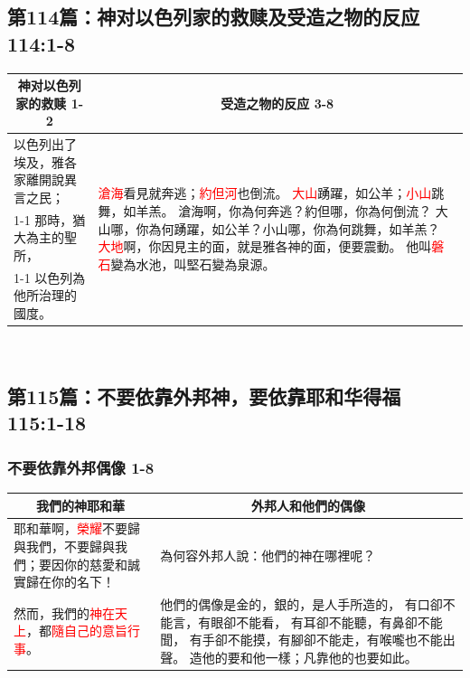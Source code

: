 \subsection{第114篇：神对以色列家的救赎及受造之物的反应 114:1-8}
\begin{table}[H]
\centering
\begin{tabular}{p{5cm}|p{12.00cm}}\hline\hline
\multicolumn{1}{c|}{神对以色列家的救赎 1-2}&\multicolumn{1}{c}{受造之物的反应 3-8}\\\hline
以色列出了埃及，雅各家離開說異言之民；
&\multirow{3}{12.2cm}{\textcolor{red}{滄海}看見就奔逃；\textcolor{red}{約但河}也倒流。
\textcolor{red}{大山}踴躍，如公羊；\textcolor{red}{小山}跳舞，如羊羔。
滄海啊，你為何奔逃？約但哪，你為何倒流？
大山哪，你為何踴躍，如公羊？小山哪，你為何跳舞，如羊羔？
\textcolor{red}{大地}啊，你因見主的面，就是雅各神的面，便要震動。
他叫\textcolor{red}{磐石}變為水池，叫堅石變為泉源。}\\\cline{1-1}
那時，猶大為主的聖所，&\\\cline{1-1}
以色列為他所治理的國度。&\\\hline
\end{tabular}
\end{table} 



\subsection{第115篇：不要依靠外邦神，要依靠耶和华得福 115:1-18}
\subsubsection{不要依靠外邦偶像 1-8}
\begin{table}[H]
\centering
\begin{tabular}{p{6.75cm}|p{10.50cm}}\hline\hline
\multicolumn{1}{c|}{我們的神耶和華}&\multicolumn{1}{c}{外邦人和他們的偶像}\\\hline
耶和華啊，\textcolor{red}{榮耀}不要歸與我們，不要歸與我們；要因你的慈愛和誠實歸在你的名下！
&為何容外邦人說：他們的神在哪裡呢？\\\hline
然而，我們的\textcolor{red}{神在天上}，都\textcolor{red}{隨自己的意旨行事}。&他們的偶像是金的，銀的，是人手所造的，
有口卻不能言，有眼卻不能看，
有耳卻不能聽，有鼻卻不能聞，
有手卻不能摸，有腳卻不能走，有喉嚨也不能出聲。
造他的要和他一樣；凡靠他的也要如此。\\\hline
\end{tabular}
\end{table} 

